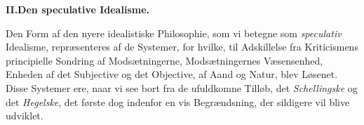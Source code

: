 \divrule

%
\begin{center}\textbf{II.\enspace Den speculative Idealisme.}\end{center}

Den Form af den nyere idealistiske Philosophie, som vi
betegne som \emph{speculativ} Idealisme, repræsenteres af de Systemer,
for hvilke, til Adskillelse fra Kriticismens principielle
Sondring af Modsætningerne, Modsætningernes Væsensenhed,
Enheden af det Subjective og det Objective, af Aand og Natur,
blev Løsenet. Disse Systemer ere, naar vi see bort fra
de ufuldkomne Tilløb, det \emph{Schellingske} og det \emph{Hegelske},
det første dog indenfor en vis Begrændsning, der sildigere
vil blive udviklet.

